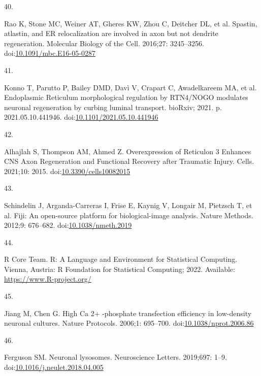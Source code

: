 \documentclass[
  12pt,
  a4paper,
]{book}
\newlength{\cslhangindent}
\newlength{\csllabelwidth}
\newlength{\cslentryspacingunit} %
\newenvironment{CSLReferences}[2] %
 {%
  \setlength{\parindent}{0pt}
  \ifodd #1
  \let\oldpar\par
  \def\par{\hangindent=\cslhangindent\oldpar}
  \fi
  \setlength{\parskip}{#2\cslentryspacingunit}
 }%
 {}
\newcommand{\CSLLeftMargin}[1]{\parbox[t]{\csllabelwidth}{#1}}
\newcommand{\CSLRightInline}[1]{\parbox[t]{\linewidth - \csllabelwidth}{#1}\break}
\begin{document}
\begin{CSLReferences}{0}{0}
\leavevmode{}%
\CSLLeftMargin{40. }%
\CSLRightInline{Rao K, Stone MC, Weiner AT, Gheres KW, Zhou C, Deitcher DL, et al. Spastin, atlastin, and {ER} relocalization are involved in axon but not dendrite regeneration. Molecular Biology of the Cell. 2016;27: 3245--3256. doi:\href{https://doi.org/10.1091/mbc.E16-05-0287}{10.1091/mbc.E16-05-0287}}

\leavevmode{}%
\CSLLeftMargin{41. }%
\CSLRightInline{Konno T, Parutto P, Bailey DMD, Davì V, Crapart C, Awadelkareem MA, et al. Endoplasmic {Reticulum} morphological regulation by {RTN4}/{NOGO} modulates neuronal regeneration by curbing luminal transport. {bioRxiv}; 2021. p. 2021.05.10.441946. doi:\href{https://doi.org/10.1101/2021.05.10.441946}{10.1101/2021.05.10.441946}}

\leavevmode{}%
\CSLLeftMargin{42. }%
\CSLRightInline{Alhajlah S, Thompson AM, Ahmed Z. Overexpression of {Reticulon} 3 {Enhances CNS Axon Regeneration} and {Functional Recovery} after {Traumatic Injury}. Cells. 2021;10: 2015. doi:\href{https://doi.org/10.3390/cells10082015}{10.3390/cells10082015}}

\leavevmode{}%
\CSLLeftMargin{43. }%
\CSLRightInline{Schindelin J, Arganda-Carreras I, Frise E, Kaynig V, Longair M, Pietzsch T, et al. Fiji: An open-source platform for biological-image analysis. Nature Methods. 2012;9: 676--682. doi:\href{https://doi.org/10.1038/nmeth.2019}{10.1038/nmeth.2019}}

\leavevmode{}%
\CSLLeftMargin{44. }%
\CSLRightInline{R Core Team. R: {A Language} and {Environment} for {Statistical Computing}. {Vienna, Austria}: {R Foundation for Statistical Computing}; 2022. Available: \url{https://www.R-project.org/}}

\leavevmode{}%
\CSLLeftMargin{45. }%
\CSLRightInline{Jiang M, Chen G. High {Ca} 2+ -phosphate transfection efficiency in low-density neuronal cultures. Nature Protocols. 2006;1: 695--700. doi:\href{https://doi.org/10.1038/nprot.2006.86}{10.1038/nprot.2006.86}}

\leavevmode{}%
\CSLLeftMargin{46. }%
\CSLRightInline{Ferguson SM. Neuronal lysosomes. Neuroscience Letters. 2019;697: 1--9. doi:\href{https://doi.org/10.1016/j.neulet.2018.04.005}{10.1016/j.neulet.2018.04.005}}


\end{CSLReferences}
\end{document}
